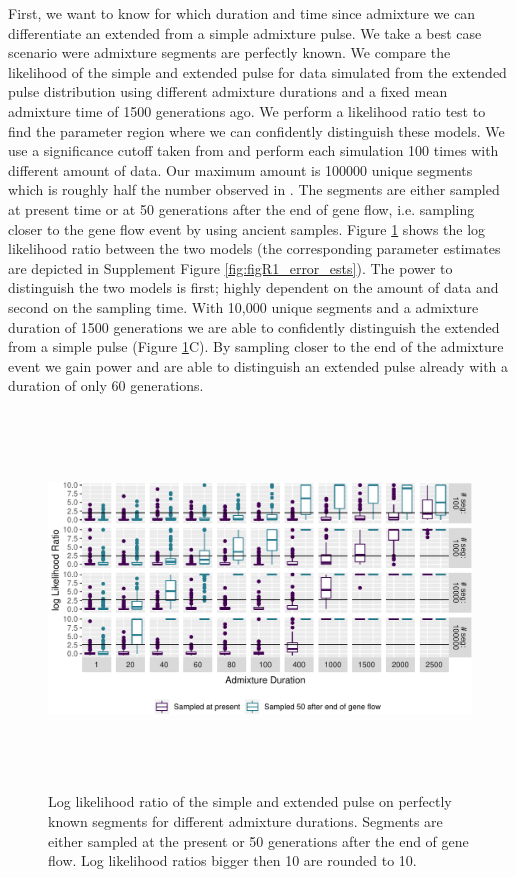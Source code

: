 \documentclass[11pt]{article}
\begin{document}
First, we want to know for which duration and time since admixture we can differentiate an extended from a simple admixture pulse. We take a best case scenario were admixture segments are perfectly known. We compare the likelihood of the simple and extended pulse for data simulated from the extended pulse distribution using different admixture durations and a fixed mean admixture time of 1500 generations ago. We perform a likelihood ratio test to find the parameter region where we can confidently distinguish these models. We use a significance cutoff taken from \cite{Kozubowski_Testing_2008} and perform each simulation 100 times with different amount of data. Our maximum amount is 100000 unique segments which is roughly half the number observed in \cite{skov_nature_2020}. The segments are either sampled at present time or at 50 generations after the end of gene flow, i.e. sampling closer to the gene flow event by using ancient samples. Figure \ref{fig:fig1_1} shows the log likelihood ratio between the two models (the corresponding parameter estimates are depicted in Supplement Figure \ref{fig:figR1_error_ests}). The power to distinguish the two models is first; highly dependent on the amount of data and second on the sampling time. With 10,000 unique segments and a admixture duration of 1500 generations we are able to confidently distinguish the extended from a simple pulse (Figure \ref{fig:fig1_1}C). By sampling closer to the end of the admixture event we gain power and are able to distinguish an extended pulse already with a duration of only 60 generations.

\begin{figure}
\centering
\includegraphics[width=16cm,height=10cm,keepaspectratio]{ATE_Revisions_files/figure-latex/figR1-1.pdf}
\caption{\label{fig:fig1_1} Log likelihood ratio of the simple and extended pulse on perfectly known segments for different admixture durations. Segments are either sampled at the present or 50 generations after the end of gene flow. Log likelihood ratios bigger then 10 are rounded to 10.}
\end{figure}
\end{document}
